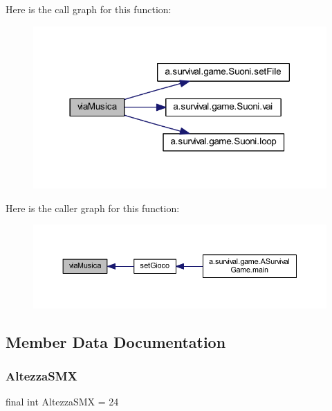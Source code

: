 Here is the call graph for this function\+:
\nopagebreak
\begin{figure}[H]
\begin{center}
\leavevmode
\includegraphics[width=318pt]{classa_1_1survival_1_1game_1_1_pannello_a443c6be9d46440deb1e73b957e28d56e_cgraph}
\end{center}
\end{figure}
Here is the caller graph for this function\+:
\nopagebreak
\begin{figure}[H]
\begin{center}
\leavevmode
\includegraphics[width=350pt]{classa_1_1survival_1_1game_1_1_pannello_a443c6be9d46440deb1e73b957e28d56e_icgraph}
\end{center}
\end{figure}


\subsection{Member Data Documentation}
\mbox{\label{classa_1_1survival_1_1game_1_1_pannello_a3373f5f9365b8e16cdf3a7bb6d6c0bc9}} 
\subsubsection{\texorpdfstring{Altezza\+S\+MX}{AltezzaSMX}}
{\footnotesize\ttfamily final int Altezza\+S\+MX = 24}

